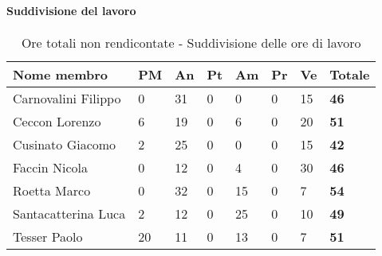 			\paragraph{Suddivisione del lavoro} %
			\label{par:suddivisione_del_lavoro}
				\begin{table}[!ht]
					\begin{center}
						\begin{tabularx}{0.9\textwidth}{|l|l|l|l|l|l|l|X|}
							\hline
							\textbf{Nome membro} & \textbf{PM} & \textbf{An} & \textbf{Pt} & \textbf{Am} & \textbf{Pr} & \textbf{Ve} & \textbf{Totale} \\
							\hline
							Carnovalini Filippo & 0 & 31 & 0 & 0 & 0 & 15 & \textbf{46} \\
							\hline
							Ceccon Lorenzo & 6 & 19 & 0 & 6 & 0 & 20 & \textbf{51} \\
							\hline
							Cusinato Giacomo & 2 & 25 & 0 & 0 & 0 & 15 & \textbf{42} \\
							\hline
							Faccin Nicola & 0 & 12 & 0 & 4 & 0 & 30 & \textbf{46} \\
							\hline
							Roetta Marco & 0 & 32 & 0 & 15 & 0 & 7 & \textbf{54} \\
							\hline
							Santacatterina Luca & 2 & 12 & 0 & 25 & 0 & 10 & \textbf{49} \\
							\hline
							Tesser Paolo & 20 & 11 & 0 & 13 & 0 & 7 & \textbf{51} \\
							\hline	
						\end{tabularx}
					\end{center}
				\caption{Ore totali non rendicontate - Suddivisione delle ore di lavoro}
				\end{table}
				
